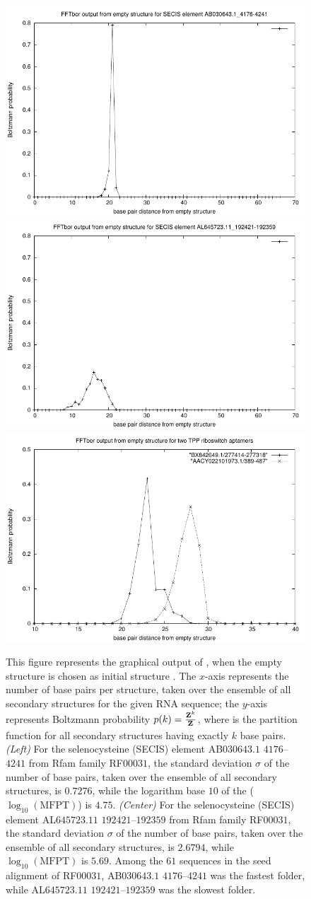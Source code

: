 \begin{figure}[!ht]
\centering
\includegraphics[width=.3\textwidth]{Figures/FFTbor/AB030643_1_4176-4241.pdf}
\includegraphics[width=.3\textwidth]{Figures/FFTbor/AL645723_11_192421-192359.pdf}
\includegraphics[width=.3\textwidth]{Figures/FFTbor/FFTborOutputFromEmptyStrForTPPriboswitches.pdf}
\caption[Example of the graphical output of \fftbor, when the empty structure is chosen as initial structure \strSt]{This figure represents the
graphical output of \fftbor, when the empty structure is chosen as
initial structure \strSt.
The $x$-axis represents the number of base pairs per structure,
taken over the ensemble of all secondary structures for the given RNA
sequence; the $y$-axis represents Boltzmann probability
$p(k) = \frac{{\bf Z}^{k}_{}}{{\bf Z}^{}_{}}$,
where \fullZ is the partition function for all secondary structures
having exactly $k$ base pairs.
{\em (Left)}
For the selenocysteine (SECIS) element AB$030643.1$ $4176$--$4241$ from Rfam family
RF$00031$, the standard deviation $\sigma$ of the number of base pairs,
taken over the ensemble of all secondary structures, is
$0.7276$, while the logarithm base $10$ of the \mfpt ($\log_{10}(\text{MFPT})$)
is $4.75$.
{\em (Center)}
For the selenocysteine (SECIS) element
AL$645723.11$ $192421$--$192359$ from Rfam family
RF$00031$, the standard deviation $\sigma$ of the number of base pairs,
taken over the ensemble of all secondary structures, is
$2.6794$, while $\log_{10}(\text{MFPT})$ is $5.69$.
Among the $61$ sequences in the seed alignment of RF$00031$,
AB$030643.1$ $4176$--$4241$ was the fastest folder, while
AL$645723.11$ $192421$--$192359$ was the slowest folder.
}
\end{figure}
